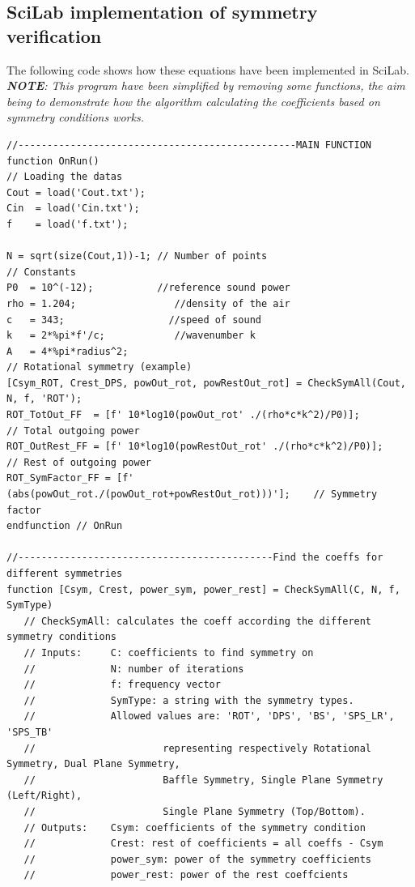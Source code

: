 \documentclass{report}
\begin{document}
\begin{appendices}
		


\chapter{SciLab implementation of symmetry verification} 
\label{Chap:imple_sym}
The following code shows how these equations have been implemented in SciLab.\\
\textit{\textbf{NOTE}: This program have been simplified by removing some functions, the aim being to demonstrate how the algorithm calculating the coefficients based on symmetry conditions works.}

\lstset{language=SCilab} 
\begin{lstlisting}
//------------------------------------------------MAIN FUNCTION
function OnRun()
// Loading the datas
Cout = load('Cout.txt');
Cin  = load('Cin.txt');
f    = load('f.txt');

N = sqrt(size(Cout,1))-1; // Number of points
// Constants 
P0  = 10^(-12);		      //reference sound power
rho = 1.204;		         //density of the air
c   = 343;		            //speed of sound
k   = 2*%pi*f'/c;	         //wavenumber k
A   = 4*%pi*radius^2; 
// Rotational symmetry (example)
[Csym_ROT, Crest_DPS, powOut_rot, powRestOut_rot] = CheckSymAll(Cout, N, f, 'ROT');
ROT_TotOut_FF  = [f' 10*log10(powOut_rot' ./(rho*c*k^2)/P0)];        // Total outgoing power 
ROT_OutRest_FF = [f' 10*log10(powRestOut_rot' ./(rho*c*k^2)/P0)];    // Rest of outgoing power
ROT_SymFactor_FF = [f' (abs(powOut_rot./(powOut_rot+powRestOut_rot)))'];    // Symmetry factor
endfunction // OnRun

//--------------------------------------------Find the coeffs for different symmetries
function [Csym, Crest, power_sym, power_rest] = CheckSymAll(C, N, f, SymType)
   // CheckSymAll: calculates the coeff according the different symmetry conditions
   // Inputs:     C: coefficients to find symmetry on 
   //             N: number of iterations 
   //             f: frequency vector
   //             SymType: a string with the symmetry types. 
   //	          Allowed values are: 'ROT', 'DPS', 'BS', 'SPS_LR', 'SPS_TB' 
   //                      representing respectively Rotational Symmetry, Dual Plane Symmetry, 
   //                      Baffle Symmetry, Single Plane Symmetry (Left/Right),
   //					   Single Plane Symmetry (Top/Bottom).
   // Outputs:    Csym: coefficients of the symmetry condition
   //             Crest: rest of coefficients = all coeffs - Csym
   //             power_sym: power of the symmetry coefficients
   //             power_rest: power of the rest coeffcients   
   

\end{lstlisting}
\end{appendices}
\end{document}

